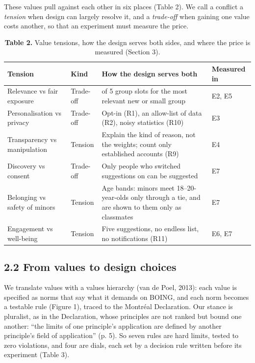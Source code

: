 \documentclass[11pt,letterpaper]{article}
\newcommand{\rowrule}{\midrule[0.2pt]}
\begin{document}
These values pull against each other in six places (Table 2). We call a conflict a \textit{tension} when
design can largely resolve it, and a \textit{trade-off} when gaining one value costs another, so that an
experiment must measure the price.

\begin{table}[!htbp]
\centering
\caption*{\textbf{Table 2.} Value tensions, how the design serves both sides, and where the price is measured
(Section 3).}
\scriptsize
\begin{tabular}{
  >{\raggedright\arraybackslash}p{}
  >{\raggedright\arraybackslash}p{}
  >{\raggedright\arraybackslash}p{}
  >{\raggedright\arraybackslash}p{}
}
\toprule
\textbf{Tension} & \textbf{Kind} & \textbf{How the design serves both} & \textbf{Measured in} \\
\midrule
Relevance vs fair exposure & Trade-off & 1 of 5 group slots for the most relevant new or small group & E2, E5 \\
\rowrule
Personalisation vs privacy & Trade-off & Opt-in (R1), an allow-list of data (R2), noisy statistics (R10) & E3 \\
\rowrule
Transparency vs manipulation & Tension & Explain the kind of reason, not the weights; count only established accounts (R9) & E4 \\
\rowrule
Discovery vs consent & Trade-off & Only people who switched suggestions on can be suggested & E7 \\
\rowrule
Belonging vs safety of minors & Tension & Age bands: minors meet 18--20-year-olds only through a tie, and are shown to them only as classmates & E7 \\
\rowrule
Engagement vs well-being & Tension & Five suggestions, no endless list, no notifications (R11) & E6, E7 \\
\bottomrule
\end{tabular}
\end{table}

\subsection{2.2 From values to design choices}

We translate values with a values hierarchy (van de Poel, 2013): each value is specified as norms that say
what it demands on BOING, and each norm becomes a testable rule (Figure 1), traced to the Montréal
Declaration. Our stance is pluralist, as in the Declaration, whose principles are not ranked but bound one
another: ``the limits of one principle's application are defined by another principle's field of application''
(p. 5). So seven rules are hard limits, tested to zero violations, and four are dials, each set by a decision
rule written before its experiment (Table 3).
\end{document}
